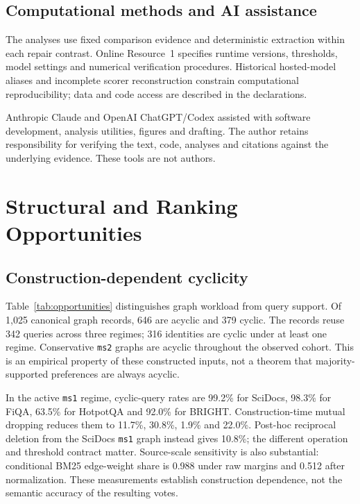 \documentclass[pdflatex,iicol,sn-basic,Numbered]{sn-jnl}
\begin{document}
\subsection{Computational methods and AI assistance}\label{sec:evidence-access}
The analyses use fixed comparison evidence and deterministic extraction within each repair contrast. Online Resource~1 specifies runtime versions, thresholds, model settings and numerical verification procedures. Historical hosted-model aliases and incomplete scorer reconstruction constrain computational reproducibility; data and code access are described in the declarations.

Anthropic Claude and OpenAI ChatGPT/Codex assisted with software development, analysis utilities, figures and drafting. The author retains responsibility for verifying the text, code, analyses and citations against the underlying evidence. These tools are not authors.

\section{Structural and Ranking Opportunities}\label{sec:opportunities}
\subsection{Construction-dependent cyclicity}
Table~\ref{tab:opportunities} distinguishes graph workload from query support. Of 1,025 canonical graph records, 646 are acyclic and 379 cyclic. The records reuse 342 queries across three regimes; 316 identities are cyclic under at least one regime. Conservative \texttt{ms2} graphs are acyclic throughout the observed cohort. This is an empirical property of these constructed inputs, not a theorem that majority-supported preferences are always acyclic.

In the active \texttt{ms1} regime, cyclic-query rates are 99.2\% for SciDocs, 98.3\% for FiQA, 63.5\% for HotpotQA and 92.0\% for BRIGHT. Construction-time mutual dropping reduces them to 11.7\%, 30.8\%, 1.9\% and 22.0\%. Post-hoc reciprocal deletion from the SciDocs \texttt{ms1} graph instead gives 10.8\%; the different operation and threshold contract matter. Source-scale sensitivity is also substantial: conditional BM25 edge-weight share is 0.988 under raw margins and 0.512 after normalization. These measurements establish construction dependence, not the semantic accuracy of the resulting votes.
\end{document}
